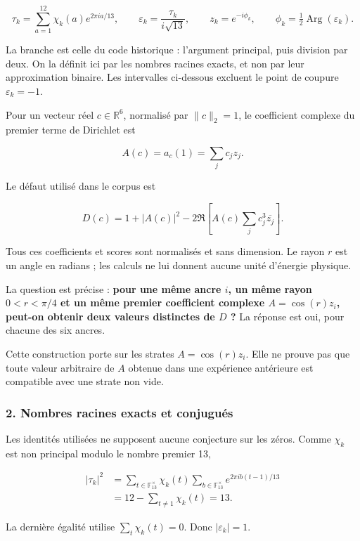 \documentclass[
  10pt,
  a4paper,
]{article}
\begin{document}
\[
\tau_k=\sum_{a=1}^{12}\chi_k(a)e^{2\pi ia/13},\qquad
\varepsilon_k=\frac{\tau_k}{i\sqrt{13}},\qquad
z_k=e^{-i\phi_k},\qquad \phi_k=\tfrac12\operatorname{Arg}(\varepsilon_k).
\]

La branche est celle du code historique : l'argument principal, puis
division par deux. On la définit ici par les nombres racines exacts, et
non par leur approximation binaire. Les intervalles ci-dessous excluent
le point de coupure \(\varepsilon_k=-1\).

Pour un vecteur réel \(c\in\mathbb R^6\), normalisé par \(\|c\|_2=1\),
le coefficient complexe du premier terme de Dirichlet est

\[
A(c)=a_c(1)=\sum_j c_j z_j.
\]

Le défaut utilisé dans le corpus est

\[
D(c)=1+|A(c)|^2
-2\Re\!\left[A(c)\sum_j c_j^3\overline{z_j}\right]. \tag{1}
\]

Tous ces coefficients et scores sont normalisés et sans dimension. Le
rayon \(r\) est un angle en radians ; les calculs ne lui donnent aucune
unité d'énergie physique.

La question est précise : \textbf{pour une même ancre \(i\), un même
rayon \(0<r<\pi/4\) et un même premier coefficient complexe
\(A=\cos(r)z_i\), peut-on obtenir deux valeurs distinctes de \(D\) ?} La
réponse est oui, pour chacune des six ancres.

Cette construction porte sur les strates \(A=\cos(r)z_i\). Elle ne
prouve pas que toute valeur arbitraire de \(A\) obtenue dans une
expérience antérieure est compatible avec une strate non vide.

\hypertarget{nombres-racines-exacts-et-conjuguuxe9s}{%
\subsubsection{2. Nombres racines exacts et
conjugués}\label{nombres-racines-exacts-et-conjuguuxe9s}}

Les identités utilisées ne supposent aucune conjecture sur les zéros.
Comme \(\chi_k\) est non principal modulo le nombre premier 13,

\[
\begin{aligned}
|\tau_k|^2
&=\sum_{t\in\mathbb F_{13}^{\times}}\chi_k(t)
  \sum_{b\in\mathbb F_{13}^{\times}}e^{2\pi ib(t-1)/13}\\
&=12-\sum_{t\ne1}\chi_k(t)=13.
\end{aligned}
\]

La dernière égalité utilise \(\sum_t\chi_k(t)=0\). Donc
\(|\varepsilon_k|=1\).
\end{document}
